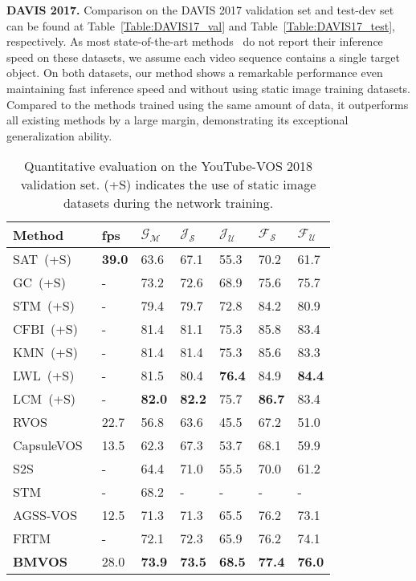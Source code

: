 \documentclass[10pt,twocolumn,letterpaper]{article}
\begin{document}
	
	
	\vspace{1mm} 
	\noindent\textbf{DAVIS 2017.} Comparison on the DAVIS 2017 validation set and test-dev set can be found at Table~\ref{Table:DAVIS17_val} and Table~\ref{Table:DAVIS17_test}, respectively. As most state-of-the-art methods~\cite{STM, GC, KMN, CFBI, RMNet, LCM} do not report their inference speed on these datasets, we assume each video sequence contains a single target object. On both datasets, our method shows a remarkable performance even maintaining fast inference speed and without using static image training datasets. Compared to the methods trained using the same amount of data, it outperforms all existing methods by a large margin, demonstrating its exceptional generalization ability. 

	
	\begin{table}
		\centering 
		\caption{Quantitative evaluation on the YouTube-VOS 2018 validation set. (+S) indicates the use of static image datasets during the network training.}
		\vspace{2mm}
		\small
		\begin{tabular}{p{2.2cm}P{0.52cm}P{0.52cm}P{0.52cm}P{0.52cm}P{0.52cm}P{0.52cm}}
			\toprule
			Method &fps &$\mathcal{G}_\mathcal{M}$ &$\mathcal{J}_\mathcal{S}$ &$\mathcal{J}_\mathcal{U}$ &$\mathcal{F}_\mathcal{S}$ &$\mathcal{F}_\mathcal{U}$\\
			\midrule
			SAT~(+S)~\cite{SAT} &\textbf{39.0} &63.6 &67.1 &55.3 &70.2 &61.7\\
			GC~(+S)~\cite{GC} &- &73.2 &72.6 &68.9 &75.6 &75.7\\
			STM~(+S)~\cite{STM} &- &79.4 &79.7 &72.8 &84.2 &80.9\\
			CFBI~(+S)~\cite{CFBI} &- &81.4 &81.1 &75.3 &85.8 &83.4\\
			KMN~(+S)~\cite{KMN} &- &81.4 &81.4 &75.3 &85.6 &83.3\\
			LWL~(+S)~\cite{LWL} &- &81.5 &80.4 &\textbf{76.4} &84.9 &\textbf{84.4}\\
		    LCM~(+S)~\cite{LCM} &- &\textbf{82.0} &\textbf{82.2} &75.7 &\textbf{86.7}&83.4\\
			\midrule
			RVOS~\cite{RVOS} &22.7 &56.8 &63.6 &45.5 &67.2 &51.0\\
			CapsuleVOS~\cite{CapsuleVOS} &13.5 &62.3 &67.3 &53.7 &68.1 &59.9\\
			S2S~\cite{S2S} &- &64.4 &71.0 &55.5 &70.0 &61.2\\
			STM~\cite{STM} &- &68.2 &- &- &- &-\\
			AGSS-VOS~\cite{AGSS-VOS} &12.5 &71.3 &71.3 &65.5 &76.2 &73.1\\
			FRTM~\cite{FRTM} &- &72.1 &72.3 &65.9 &76.2 &74.1\\
			\midrule
			\textbf{BMVOS} &28.0 &\textbf{73.9} &\textbf{73.5} &\textbf{68.5} &\textbf{77.4} &\textbf{76.0}\\
			\bottomrule
		\end{tabular}
		\label{Table:YTVOS}
	\end{table}
	
\end{document}

